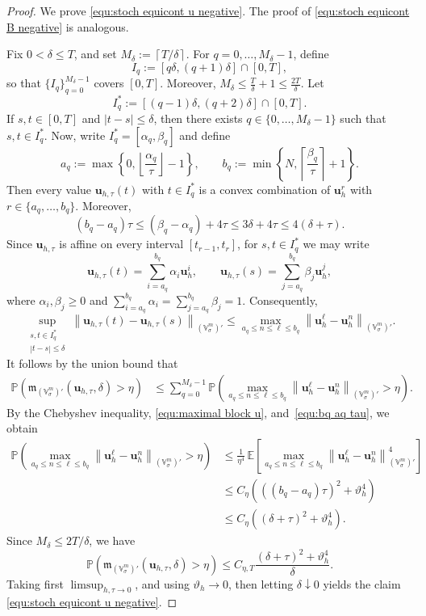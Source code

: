 \documentclass[11pt, reqno]{amsart}
\theoremstyle{definition}
\numberwithin{equation}{section}
\newcommand{\bff}{\boldsymbol}
\newcommand{\bb}{\mathbb}
\newcommand{\norm}[2]{\left\|{#1}\right\|_{#2}}
\begin{document}
\begin{proof}
	We prove \eqref{equ:stoch equicont u negative}. The proof of \eqref{equ:stoch equicont B negative} is analogous.
	
	Fix $0<\delta\le T$, and set $M_\delta:=\left\lceil T/\delta \right\rceil$.
	For $q=0,\ldots,M_\delta-1$, define
	\[
	I_q:=[q\delta,(q+1)\delta]\cap[0,T],
	\]
	so that $\{I_q\}_{q=0}^{M_\delta-1}$ covers $[0,T]$. Moreover, $M_\delta\le \frac{T}{\delta}+1\le \frac{2T}{\delta}$.
	Let
	\[
	I_q^\ast:=[(q-1)\delta,(q+2)\delta]\cap[0,T].
	\]
	If $s,t\in[0,T]$ and $|t-s|\le\delta$, then there exists
	$q\in\{0,\ldots,M_\delta-1\}$ such that $s,t\in I_q^\ast$.
	Now, write $I_q^\ast=[\alpha_q,\beta_q]$ and define
	\[
	a_q:=\max\left\{0,\left\lfloor\frac{\alpha_q}{\tau}\right\rfloor-1\right\},
	\qquad
	b_q:=\min\left\{N,\left\lceil\frac{\beta_q}{\tau}\right\rceil+1\right\}.
	\]
	Then every value $\bff u_{h,\tau}(t)$ with $t\in I_q^\ast$ is a convex
	combination of $\bff u_h^r$ with
	$r\in\{a_q,\ldots,b_q\}$. Moreover,
	\begin{equation}\label{equ:bq aq tau}
		(b_q-a_q)\tau
		\le
		(\beta_q-\alpha_q)+4\tau
		\le
		3\delta+4\tau
		\le
		4(\delta+\tau).
	\end{equation}
	Since $\bff u_{h,\tau}$ is affine on every interval $[t_{r-1},t_r]$, for
	$s,t\in I_q^\ast$ we may write
	\[
	\bff u_{h,\tau}(t)
	=
	\sum_{i=a_q}^{b_q}\alpha_i\bff u_h^i,
	\qquad
	\bff u_{h,\tau}(s)
	=
	\sum_{j=a_q}^{b_q}\beta_j\bff u_h^j,
	\]
	where $\alpha_i,\beta_j\ge0$ and $\sum_{i=a_q}^{b_q}\alpha_i= \sum_{j=a_q}^{b_q}\beta_j= 1$.
	Consequently,
	\[
	\sup_{\substack{s,t\in I_q^\ast\\ |t-s|\le\delta}}
	\norm{\bff u_{h,\tau}(t)-\bff u_{h,\tau}(s)}{(\bb V^m_\sigma)'}
	\le
	\max_{a_q\le n\le \ell\le b_q}
	\norm{\bff u_h^\ell-\bff u_h^n}{(\bb V^m_\sigma)'}.
	\]
	It follows by the union bound that
	\begin{align*}
		\bb P\left(
		\mathfrak m_{(\bb V^m_\sigma)'}(\bff u_{h,\tau},\delta)>\eta
		\right)
		&\le
		\sum_{q=0}^{M_\delta-1}
		\bb P\left(
		\max_{a_q\le n\le \ell\le b_q}
		\norm{\bff u_h^\ell-\bff u_h^n}{(\bb V^m_\sigma)'}
		>\eta
		\right).
	\end{align*}
	By the Chebyshev inequality, \eqref{equ:maximal block u}, and~\eqref{equ:bq aq tau}, we obtain
	\begin{align*}
		\bb P\left(
		\max_{a_q\le n\le \ell\le b_q}
		\norm{\bff u_h^\ell-\bff u_h^n}{(\bb V^m_\sigma)'}
		>\eta
		\right)
		&\le
		\frac{1}{\eta^4}\, \bb E
		\left[
		\max_{a_q\le n\le \ell\le b_q}
		\norm{\bff u_h^\ell-\bff u_h^n}{(\bb V^m_\sigma)'}^{4}
		\right]
		\\
		&\le
		C_\eta
		\left(((b_q-a_q)\tau)^2+\vartheta_h^4\right)
		\\
		&\le
		C_\eta
		\left((\delta+\tau)^2+\vartheta_h^4\right).
	\end{align*}
	Since $M_\delta\le 2T/\delta$, we have
	\[
	\bb P\left(
	\mathfrak m_{(\bb V^m_\sigma)'}(\bff u_{h,\tau},\delta)>\eta
	\right)
	\le
	C_{\eta,T}
	\frac{(\delta+\tau)^2+\vartheta_h^4}{\delta}.
	\]
	Taking first $\limsup_{h,\tau\to0}$, and using $\vartheta_h\to0$, then letting $\delta\downarrow0$ yields the claim \eqref{equ:stoch equicont u negative}.
	

\end{proof}
\end{document}

